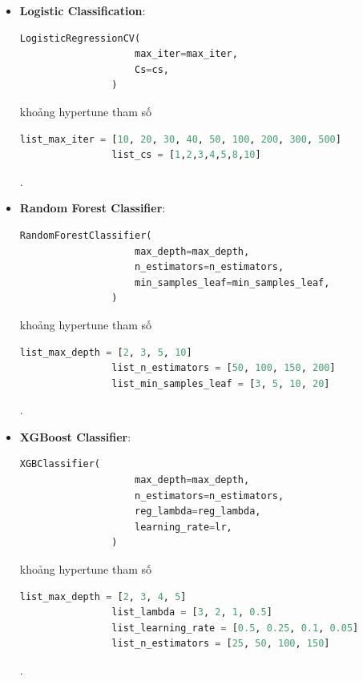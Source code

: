     \begin{itemize}
        \item \textbf{Logistic Classification}: 

            \begin{lstlisting}[language=Python]
                LogisticRegressionCV(
                    max_iter=max_iter,
                    Cs=cs,
                )
            \end{lstlisting}

            khoảng hypertune tham số

            \begin{lstlisting}[language=Python]
                list_max_iter = [10, 20, 30, 40, 50, 100, 200, 300, 500]
                list_cs = [1,2,3,4,5,8,10]
            \end{lstlisting}.

        \item \textbf{Random Forest Classifier}:

            \begin{lstlisting}[language=Python]
                RandomForestClassifier(
                    max_depth=max_depth,
                    n_estimators=n_estimators,
                    min_samples_leaf=min_samples_leaf,
                )
            \end{lstlisting}

            khoảng hypertune tham số

            \begin{lstlisting}[language=Python]
                list_max_depth = [2, 3, 5, 10]
                list_n_estimators = [50, 100, 150, 200]
                list_min_samples_leaf = [3, 5, 10, 20]
            \end{lstlisting}.

        \item \textbf{XGBoost Classifier}:
            \begin{lstlisting}[language=Python]
                XGBClassifier(
                    max_depth=max_depth,
                    n_estimators=n_estimators,
                    reg_lambda=reg_lambda,
                    learning_rate=lr,
                )
            \end{lstlisting}

            khoảng hypertune tham số

            \begin{lstlisting}[language=Python]
                list_max_depth = [2, 3, 4, 5]
                list_lambda = [3, 2, 1, 0.5]
                list_learning_rate = [0.5, 0.25, 0.1, 0.05]
                list_n_estimators = [25, 50, 100, 150]
            \end{lstlisting}.
        
    \end{itemize}

